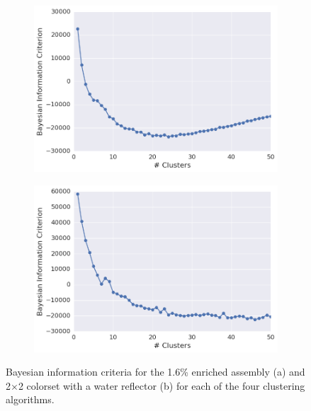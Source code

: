 \begin{figure}[h!]
\centering
\begin{subfigure}{\textwidth}
  \centering
  \includegraphics[width=0.9\linewidth]{figures/results/model-select/assm-16/bic-combined-U238-capture-1}
  \caption{}
  \label{fig:chap11-assm-16-bic}
\end{subfigure}
\begin{subfigure}{\textwidth}
  \centering
  \includegraphics[width=0.9\linewidth]{figures/results/model-select/reflector/bic-combined-U238-nu-fission-1}
  \caption{}
  \label{fig:chap11-refl-bic}
\end{subfigure}
\caption[Bayesian information criterion variation with the number of clusters]{Bayesian information criteria for the 1.6\% enriched assembly (a) and 2$\times$2 colorset with a water reflector (b) for each of the four clustering algorithms.}
\label{fig:chap11-bic}
\end{figure}

\clearpage

